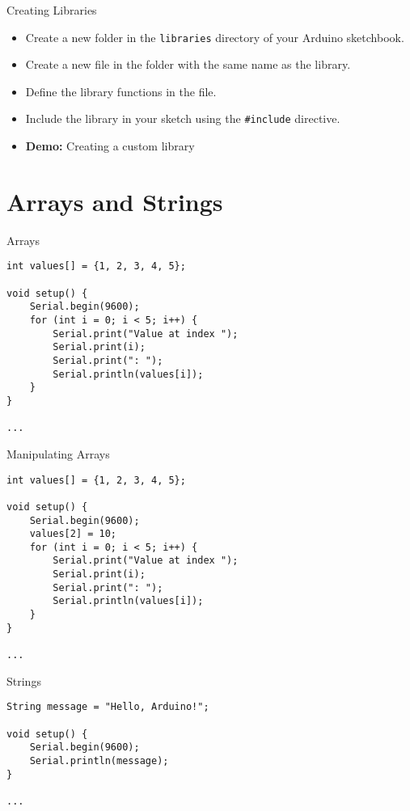 \documentclass[sectionframe]{oxblue-beamer}
\begin{document}
\begin{frame}[fragile]{Creating Libraries}
\begin{itemize}
    \item Create a new folder in the \texttt{libraries} directory of your Arduino sketchbook.
    \item Create a new file in the folder with the same name as the library.
    \item Define the library functions in the file.
    \item Include the library in your sketch using the \texttt{\#include} directive.
    \item \textbf{Demo:} Creating a custom library
\end{itemize}
\end{frame}

\section{Arrays and Strings}

\begin{frame}[fragile]{Arrays}
\begin{verbatim}
int values[] = {1, 2, 3, 4, 5};

void setup() {
    Serial.begin(9600);
    for (int i = 0; i < 5; i++) {
        Serial.print("Value at index ");
        Serial.print(i);
        Serial.print(": ");
        Serial.println(values[i]);
    }
}

...
\end{verbatim}
\end{frame}

\begin{frame}[fragile]{Manipulating Arrays}
\begin{verbatim}
int values[] = {1, 2, 3, 4, 5};

void setup() {
    Serial.begin(9600);
    values[2] = 10;
    for (int i = 0; i < 5; i++) {
        Serial.print("Value at index ");
        Serial.print(i);
        Serial.print(": ");
        Serial.println(values[i]);
    }
}

...
\end{verbatim}
\end{frame}

\begin{frame}[fragile]{Strings}
\begin{verbatim}
String message = "Hello, Arduino!";

void setup() {
    Serial.begin(9600);
    Serial.println(message);
}

...
\end{verbatim}
\end{frame}
\end{document}
